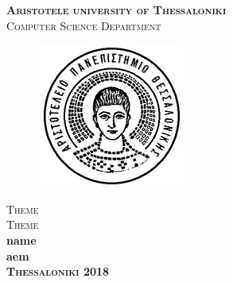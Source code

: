 \documentclass[a4paper,11pt]{article}
\newcommand{\lt}{\latintext}
\begin{document}
  \lt
	\begin{titlepage}
		\begin{center}
			\textsc{\LARGE \bfseries Aristotele university of Thessaloniki}\\[0.2cm]
			\textsc{\large Computer Science Department}\\	
			\begin{figure}[h!]
				\begin{center}
					\leavevmode
					\includegraphics[scale=0.8, trim = 0mm 0mm 0mm 0mm, clip]{auth.jpg}
				\end{center}
			\end{figure}
			\vspace{2cm}
			\textsc{\Large Theme \\Theme\\\vspace{3cm}}
				\large \bfseries name \\ aem 
			\\
		\vspace*{\fill}
		\vspace{3cm}
		\textsc{Thessaloniki 2018}		
		\end{center}
	\end{titlepage}
	\newpage
\end{document}
